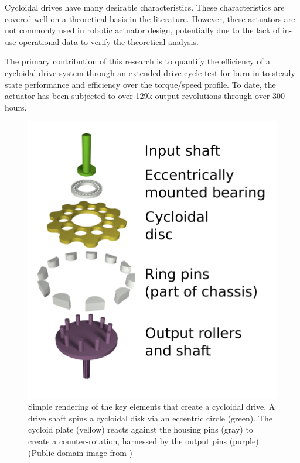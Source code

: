 Cycloidal drives have many desirable characteristics. These characteristics are covered well on a theoretical basis in the literature. However, these actuators are not commonly used in robotic actuator design, potentially due to the lack of in-use operational data to verify the theoretical analysis.

The primary contribution of this research is to quantify the efficiency of a cycloidal drive system through an extended drive cycle test for burn-in to steady state performance and efficiency over the torque/speed profile.
To date, the actuator has been subjected to over 129k output revolutions through over 300 hours.

\begin{figure}[!b]
   \centering
   \includegraphics[width=0.60\linewidth]{images/Cycloidal_drive_parts}
    \caption{Simple rendering of the key elements that create a cycloidal drive.
   	A drive shaft spins a cycloidal disk via an eccentric circle (green).
   	The cycloid plate (yellow) reacts against the housing pins (gray) to create a counter-rotation, harnessed by the output pins (purple). (Public domain image from \cite{cycloid_cartoon})}
   \label{cycloid_cartoon}
\end{figure}


